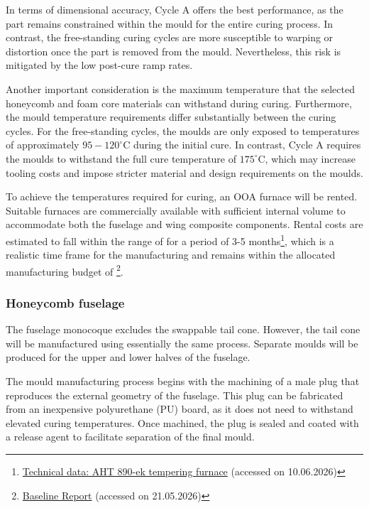 In terms of dimensional accuracy, Cycle A offers the best performance, as the part remains constrained within the mould for the entire curing process. In contrast, the free-standing curing cycles are more susceptible to warping or distortion once the part is removed from the mould. Nevertheless, this risk is mitigated by the low post-cure ramp rates.

Another important consideration is the maximum temperature that the selected honeycomb and foam core materials can withstand during curing. Furthermore, the mould temperature requirements differ substantially between the curing cycles. For the free-standing cycles, the moulds are only exposed to temperatures of approximately $95-120^\circ$C during the initial cure. In contrast, Cycle A requires the moulds to withstand the full cure temperature of $175^\circ$C, which may increase tooling costs and impose stricter material and design requirements on the moulds.

To achieve the temperatures required for curing, an OOA furnace will be rented. Suitable furnaces are commercially available with sufficient internal volume to accommodate both the fuselage and wing composite components. Rental costs are estimated to fall within the range of  for a period of 3-5 months\footnote{\href{https://www.airtec-gmbh.de/wp-content/uploads/2023/10/Renting-an-industrial-furnace.pdf}{Technical data: AHT 890-ek tempering furnace} (accessed on 10.06.2026)}, which is a realistic time frame for the manufacturing and remains within the allocated manufacturing budget of  \footnote{\label{url:baseline_report}\href{https://github.com/Teo-Cokonaj/DSE-28/blob/main/docs/Projects/DSE_Group_28_Baseline_Report.pdf}{Baseline Report} (accessed on 21.05.2026)}.



\subsubsection{\textbf{Honeycomb fuselage}}

The fuselage monocoque excludes the swappable tail cone. However, the tail cone will be manufactured using essentially the same process. Separate moulds will be produced for the upper and lower halves of the fuselage.

The mould manufacturing process begins with the machining of a male plug that reproduces the external geometry of the fuselage. This plug can be fabricated from an inexpensive polyurethane (PU) board, as it does not need to withstand elevated curing temperatures. Once machined, the plug is sealed and coated with a release agent to facilitate separation of the final mould.

